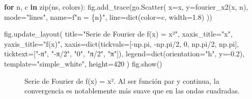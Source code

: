 \documentclass[
  letterpaper,
  DIV=11,
  numbers=noendperiod]{scrreprt}
\newenvironment{Shaded}{\begin{snugshade}}{\end{snugshade}}
\newcommand{\BuiltInTok}[1]{\textcolor[rgb]{0.00,0.23,0.31}{#1}}
\newcommand{\ControlFlowTok}[1]{\textcolor[rgb]{0.00,0.23,0.31}{\textbf{#1}}}
\newcommand{\DecValTok}[1]{\textcolor[rgb]{0.68,0.00,0.00}{#1}}
\newcommand{\FloatTok}[1]{\textcolor[rgb]{0.68,0.00,0.00}{#1}}
\newcommand{\KeywordTok}[1]{\textcolor[rgb]{0.00,0.23,0.31}{\textbf{#1}}}
\newcommand{\NormalTok}[1]{\textcolor[rgb]{0.00,0.23,0.31}{#1}}
\newcommand{\OperatorTok}[1]{\textcolor[rgb]{0.37,0.37,0.37}{#1}}
\newcommand{\SpecialCharTok}[1]{\textcolor[rgb]{0.37,0.37,0.37}{#1}}
\newcommand{\SpecialStringTok}[1]{\textcolor[rgb]{0.13,0.47,0.30}{#1}}
\newcommand{\StringTok}[1]{\textcolor[rgb]{0.13,0.47,0.30}{#1}}
\begin{document}
\begin{Shaded}
\begin{Highlighting}[]
\ControlFlowTok{for}\NormalTok{ n, c }\KeywordTok{in} \BuiltInTok{zip}\NormalTok{(ns, colors):}
\NormalTok{    fig.add\_trace(go.Scatter(}
\NormalTok{        x}\OperatorTok{=}\NormalTok{x, y}\OperatorTok{=}\NormalTok{fourier\_x2(x, n),}
\NormalTok{        mode}\OperatorTok{=}\StringTok{"lines"}\NormalTok{, name}\OperatorTok{=}\SpecialStringTok{f"n = }\SpecialCharTok{\{}\NormalTok{n}\SpecialCharTok{\}}\SpecialStringTok{"}\NormalTok{,}
\NormalTok{        line}\OperatorTok{=}\BuiltInTok{dict}\NormalTok{(color}\OperatorTok{=}\NormalTok{c, width}\OperatorTok{=}\FloatTok{1.8}\NormalTok{)}
\NormalTok{    ))}

\NormalTok{fig.update\_layout(}
\NormalTok{    title}\OperatorTok{=}\StringTok{"Serie de Fourier de f(x) = x²"}\NormalTok{,}
\NormalTok{    xaxis\_title}\OperatorTok{=}\StringTok{"x"}\NormalTok{,}
\NormalTok{    yaxis\_title}\OperatorTok{=}\StringTok{"f(x)"}\NormalTok{,}
\NormalTok{    xaxis}\OperatorTok{=}\BuiltInTok{dict}\NormalTok{(tickvals}\OperatorTok{=}\NormalTok{[}\OperatorTok{{-}}\NormalTok{np.pi, }\OperatorTok{{-}}\NormalTok{np.pi}\OperatorTok{/}\DecValTok{2}\NormalTok{, }\DecValTok{0}\NormalTok{, np.pi}\OperatorTok{/}\DecValTok{2}\NormalTok{, np.pi],}
\NormalTok{               ticktext}\OperatorTok{=}\NormalTok{[}\StringTok{"{-}π"}\NormalTok{, }\StringTok{"{-}π/2"}\NormalTok{, }\StringTok{"0"}\NormalTok{, }\StringTok{"π/2"}\NormalTok{, }\StringTok{"π"}\NormalTok{]),}
\NormalTok{    legend}\OperatorTok{=}\BuiltInTok{dict}\NormalTok{(orientation}\OperatorTok{=}\StringTok{"h"}\NormalTok{, y}\OperatorTok{={-}}\FloatTok{0.2}\NormalTok{),}
\NormalTok{    template}\OperatorTok{=}\StringTok{"simple\_white"}\NormalTok{,}
\NormalTok{    height}\OperatorTok{=}\DecValTok{420}
\NormalTok{)}
\NormalTok{fig.show()}
\end{Highlighting}
\end{Shaded}

\begin{figure}


\caption{\label{fig-ej-d}Serie de Fourier de f(x) = x². Al ser función
par y continua, la convergencia es notablemente más suave que en las
ondas cuadradas.}

\end{figure}%
\end{document}
